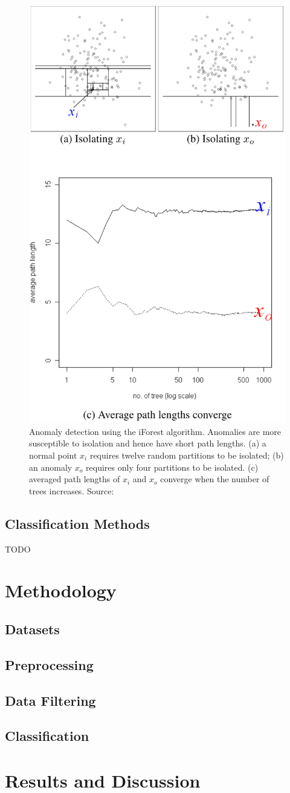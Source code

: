 \documentclass[12pt, english, openany]{book}
\begin{document}
\begin{figure}[H]
	\centering
	\includegraphics[width=.5\linewidth]{iforest_demo.png}
  \caption[Anomaly detection using the iForest algorithm.]{Anomaly detection
  using the iForest algorithm. Anomalies are more susceptible to isolation and
  hence have short path lengths. (a) a normal point $x_i$ requires twelve
  random partitions to be isolated; (b) an anomaly $x_o$ requires only four
  partitions to be isolated. (c) averaged path lengths of $x_i$ and $x_o$
  converge when the number of trees increases. Source: \cite{Liu2008}}
  \label{fig:iforest-demonstration}
\end{figure}


\section{Classification Methods}
TODO

\chapter{Methodology}

\section{Datasets}

\section{Preprocessing}

\section{Data Filtering}

\section{Classification}

\chapter{Results and Discussion}





\end{document}
